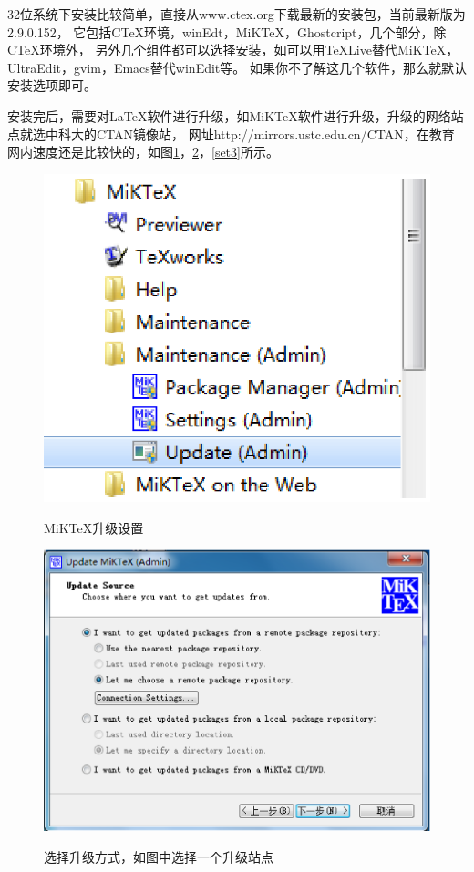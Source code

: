 32位系统下安装比较简单，直接从www.ctex.org下载最新的安装包，当前最新版为2.9.0.152，
它包括CTeX环境，winEdt，MiKTeX，Ghostcript，几个部分，除CTeX环境外，
另外几个组件都可以选择安装，如可以用TeXLive替代MiKTeX，UltraEdit，gvim，Emacs替代winEdit等。
如果你不了解这几个软件，那么就默认安装选项即可。

安装完后，需要对\LaTeX 软件进行升级，如MiKTeX软件进行升级，升级的网络站点就选中科大的CTAN镜像站，
网址http://mirrors.ustc.edu.cn/CTAN，在教育网内速度还是比较快的，如图\ref{set1}，\ref{set2}，\ref{set3}所示。

\begin{figure}[th]
\centering
\includegraphics[scale=0.5]{./Pictures/set1.eps}\\
\caption{MiKTeX升级设置}
\label{set1}
\end{figure}

\begin{figure}[th]
\centering
\includegraphics[scale=0.5]{./Pictures/set2.eps}\\
\caption{选择升级方式，如图中选择一个升级站点}
\label{set2}
\end{figure}

